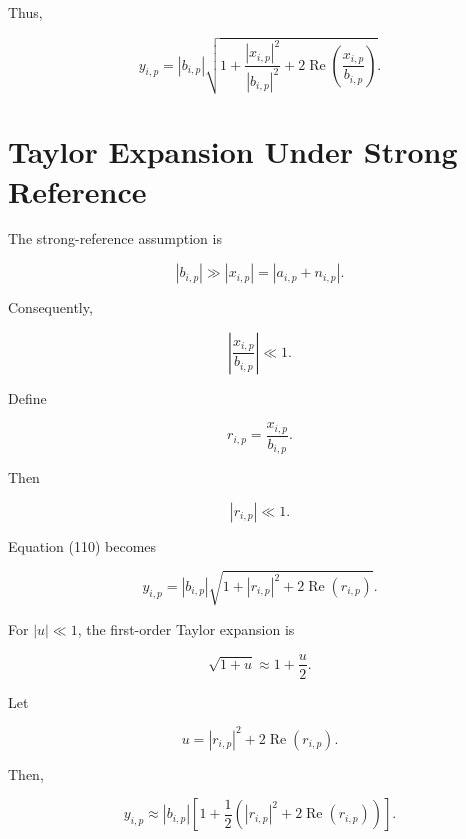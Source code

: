 \documentclass[12pt,a4paper]{article}
\begin{document}
Thus,

\begin{equation}
\boxed{
y_{i,p}
=
|b_{i,p}|
\sqrt{
1+
\frac{|x_{i,p}|^2}{|b_{i,p}|^2}
+
2\operatorname{Re}
\left(
\frac{x_{i,p}}{b_{i,p}}
\right)
}
}.
\tag{110}
\end{equation}

\section{Taylor Expansion Under Strong Reference}

The strong-reference assumption is

\begin{equation}
|b_{i,p}|
\gg
|x_{i,p}|
=
|a_{i,p}+n_{i,p}|.
\tag{111}
\end{equation}

Consequently,

\begin{equation}
\left|
\frac{x_{i,p}}{b_{i,p}}
\right|
\ll 1.
\tag{112}
\end{equation}

Define

\begin{equation}
r_{i,p}
=
\frac{x_{i,p}}{b_{i,p}}.
\tag{113}
\end{equation}

Then

\begin{equation}
|r_{i,p}|\ll1.
\tag{114}
\end{equation}

Equation (110) becomes

\begin{equation}
y_{i,p}
=
|b_{i,p}|
\sqrt{
1+
|r_{i,p}|^2
+
2\operatorname{Re}(r_{i,p})
}.
\tag{115}
\end{equation}

For $|u|\ll1$, the first-order Taylor expansion is

\begin{equation}
\sqrt{1+u}
\approx
1+\frac{u}{2}.
\tag{116}
\end{equation}

Let

\begin{equation}
u
=
|r_{i,p}|^2
+
2\operatorname{Re}(r_{i,p}).
\tag{117}
\end{equation}

Then,

\begin{equation}
y_{i,p}
\approx
|b_{i,p}|
\left[
1+
\frac{1}{2}
\left(
|r_{i,p}|^2
+
2\operatorname{Re}(r_{i,p})
\right)
\right].
\tag{118}
\end{equation}
\end{document}
